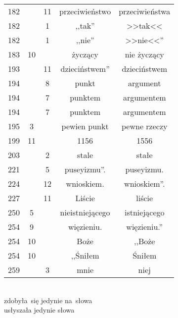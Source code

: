 \documentclass[a4paper,11pt]{article}
\begin{document}
\begin{center}
\begin{tabular}{|c|c|c|c|c|}
    182 & & 11 & przeciwieństwo & przeciwieństwa \\
    182 & &  1 & ,,tak'' & >>tak<<  %
    \\
    182 & &  1 & ,,nie'' & >>nie<<''  %
    \\
    183 & 10 & & życzący & nie życzący \\
    193 & & 11 & dzieciństwem'' & dzieciństwem \\
    194 & &  8 & punkt & argument \\
    194 & &  7 & punktem & argumentem \\
    194 & &  7 & punktem & argumentem \\
    195 &  3 & & pewien punkt & pewne rzeczy \\
    199 & 11 & & 1156 & 1556 \\
    203 & &  2 & stale & stałe \\
    221 & &  5 & puseyizmu''. & puseyizmu. \\
    224 & & 12 & wnioskiem. & wnioskiem''. \\
    227 & & 11 & Liście & liście \\
    250 &  5 & & nieistniejącego & istniejącego \\
    254 &  9 & & więzieniu. & więzieniu.'' \\
    254 & 10 & & Boże & ,,Boże  %
    \\
    254 & 10 & & ,,Śniłem  %
           & Śniłem \\
    259 & &  3 & mnie & niej \\
    \hline
  \end{tabular}
\end{center}
\noi
{} \\
\Jest  zdobyła~się jedynie na~słowa \\
\Powin usłyszała jedynie słowa \\

\vspace{\spaceTwo}










\newpage
\end{document}
